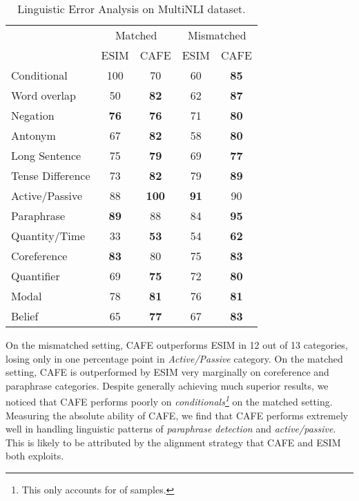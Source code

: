 \documentclass[11pt,a4paper]{article}
\begin{document}
\begin{table}[htbp]
  \centering
  \small

    \begin{tabular}{|l|cccc|}
    \hline
          & \multicolumn{2}{c}{Matched}        & \multicolumn{2}{c|}{Mismatched}  \\

          & \multicolumn{1}{c}{ESIM} & \multicolumn{1}{c}{CAFE} & \multicolumn{1}{c}{ESIM} & \multicolumn{1}{c|}{CAFE} \\
          \hline
    Conditional & 100   & 70    & 60    & \textbf{85} \\
    Word overlap & 50    & \textbf{82} & 62    & \textbf{87} \\
    Negation & \textbf{76}    & \textbf{76}    & 71    & \textbf{80} \\
    Antonym & 67    & \textbf{82} & 58    & \textbf{80} \\
    Long Sentence & 75    & \textbf{79} & 69    & \textbf{77} \\
    Tense Difference & 73    & \textbf{82} & 79    & \textbf{89} \\
    Active/Passive & 88    & \textbf{100} & \textbf{91}    & 90 \\
    Paraphrase & \textbf{89}    & 88    & 84    & \textbf{95} \\
    Quantity/Time  & 33    & \textbf{53} & 54    & \textbf{62} \\
    Coreference & \textbf{83}    & 80    & 75    & \textbf{83} \\
    Quantifier & 69    & \textbf{75} & 72    & \textbf{80} \\
    Modal & 78    & \textbf{81} & 76    & \textbf{81} \\
    Belief & 65    & \textbf{77} & 67    & \textbf{83} \\
    \hline
    \end{tabular}\caption{Linguistic Error Analysis on MultiNLI dataset. }
  \label{tab:error}\end{table}

On the mismatched setting, CAFE outperforms ESIM in 12 out of 13 categories, losing only in one percentage point in \textit{Active/Passive} category. On the matched setting, CAFE is outperformed by ESIM very marginally on coreference and paraphrase categories. Despite generally achieving much superior results, we noticed that CAFE performs poorly on \textit{conditionals\footnote{This only accounts for  of samples.}} on the matched setting. Measuring the absolute ability of CAFE, we find that CAFE performs extremely well in handling linguistic patterns of \textit{paraphrase detection} and \textit{active/passive}. This is likely to be attributed by the alignment strategy that CAFE and ESIM both exploits.
\end{document}
